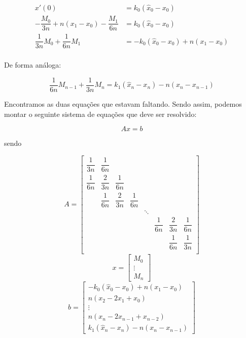 \documentclass{article}
\begin{document}
\begin{enumerate}
\begin{enumerate}
                    \begin{align*}
                        x'(0) &= k_0(\hat{x}_0 - x_0) \\
                        -\dfrac{M_0}{3n} + n(x_1 - x_0) - \dfrac{M_1}{6n} &= k_0(\hat{x}_0 - x_0) \\
                        \dfrac{1}{3n}M_0 + \dfrac{1}{6n}M_1 &= -k_0(\hat{x}_0 - x_0) + n(x_1 - x_0) \\
                    \end{align*}

                    De forma análoga:

                    $$\dfrac{1}{6n}M_{n-1} + \dfrac{1}{3n}M_n = k_1 (\hat{x}_n - x_n) - n(x_n - x_{n-1})$$

                    Encontramos as duas equações que estavam faltando. Sendo assim, podemos montar o seguinte
                    sistema de equações que deve ser resolvido:

                    $$Ax = b$$

                    sendo

                    $$A = \begin{bmatrix}
                        \dfrac{1}{3n} & \dfrac{1}{6n}  \\[6pt]
                        \dfrac{1}{6n} & \dfrac{2}{3n} & \dfrac{1}{6n}  \\[6pt]
                        & \dfrac{1}{6n} & \dfrac{2}{3n} & \dfrac{1}{6n}  \\[6pt]
                        & & & & \ddots \\[6pt]
                        & & & & & \dfrac{1}{6n} & \dfrac{2}{3n} & \dfrac{1}{6n}  \\[6pt]
                        & & & & & & \dfrac{1}{6n} & \dfrac{1}{3n}  \\[6pt]
                        \end{bmatrix}$$
                    $$x = \begin{bmatrix}
                            M_0 \\
                            \vdots \\
                            M_n
                        \end{bmatrix}$$
                    $$b = \begin{bmatrix}
                            -k_0(\hat{x}_0 - x_0) + n(x_1 - x_0) \\
                            n(x_{2} - 2x_1 + x_{0}) \\
                            \vdots \\
                            n(x_n - 2x_{n-1} + x_{n-2}) \\
                            k_1 (\hat{x}_n - x_n) - n(x_n - x_{n-1})
                        \end{bmatrix}$$


\end{enumerate}
\end{enumerate}
\end{document}

